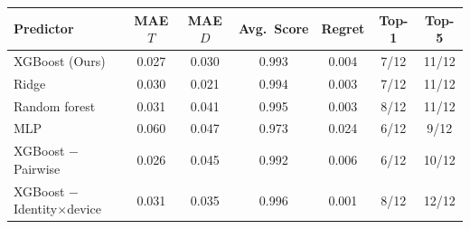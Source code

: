 \begin{tabular}{lcccccc}
\toprule
Predictor & MAE $T$ & MAE $D$ & Avg.\ Score & Regret & Top-1 & Top-5 \\
\midrule
XGBoost (Ours) & 0.027 & 0.030 & 0.993 & 0.004 & 7/12 & 11/12 \\
Ridge & 0.030 & 0.021 & 0.994 & 0.003 & 7/12 & 11/12 \\
Random forest & 0.031 & 0.041 & 0.995 & 0.003 & 8/12 & 11/12 \\
MLP & 0.060 & 0.047 & 0.973 & 0.024 & 6/12 & 9/12 \\
XGBoost $-$Pairwise & 0.026 & 0.045 & 0.992 & 0.006 & 6/12 & 10/12 \\
XGBoost $-$Identity$\times$device & 0.031 & 0.035 & 0.996 & 0.001 & 8/12 & 12/12 \\
\bottomrule
\end{tabular}
